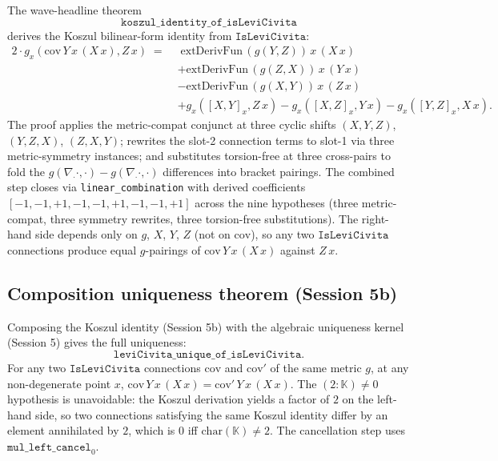\documentclass[twocolumn]{revtex4-2}
\begin{document}
The wave-headline theorem
\begin{equation*}
\texttt{koszul\_identity\_of\_isLeviCivita}
\end{equation*}
derives the Koszul bilinear-form identity from $\texttt{IsLeviCivita}$:
\begin{align*}
2 \cdot g_x(\mathrm{cov}\,Y\,x\,(X\,x), Z\,x)
\;=\;& \;\mathrm{extDerivFun}\,(g(Y, Z))\,x\,(X\,x) \\
& + \mathrm{extDerivFun}\,(g(Z, X))\,x\,(Y\,x) \\
& - \mathrm{extDerivFun}\,(g(X, Y))\,x\,(Z\,x) \\
& + g_x([X, Y]_x, Z\,x) - g_x([X, Z]_x, Y\,x) - g_x([Y, Z]_x, X\,x).
\end{align*}
The proof applies the metric-compat conjunct at three cyclic shifts
$(X,Y,Z)$, $(Y,Z,X)$, $(Z,X,Y)$; rewrites the slot-2 connection terms
to slot-1 via three metric-symmetry instances; and substitutes
torsion-free at three cross-pairs to fold the $g(\nabla_\cdot \cdot,
\cdot) - g(\nabla_\cdot \cdot, \cdot)$ differences into bracket
pairings. The combined step closes via
\texttt{linear\_combination} with derived coefficients $[-1, -1,
+1, -1, -1, +1, -1, -1, +1]$ across the nine hypotheses (three
metric-compat, three symmetry rewrites, three torsion-free
substitutions). The right-hand side depends only on $g$, $X$, $Y$, $Z$
(not on $\mathrm{cov}$), so any two $\texttt{IsLeviCivita}$
connections produce equal $g$-pairings of $\mathrm{cov}\,Y\,x\,(X\,x)$
against $Z\,x$.

\subsection{Composition uniqueness theorem (Session 5b)}

Composing the Koszul identity (Session 5b) with the algebraic
uniqueness kernel (Session 5) gives the full uniqueness:
\begin{equation*}
\texttt{leviCivita\_unique\_of\_isLeviCivita}.
\end{equation*}
For any two $\texttt{IsLeviCivita}$ connections $\mathrm{cov}$ and
$\mathrm{cov}'$ of the same metric $g$, at any non-degenerate point
$x$, $\mathrm{cov}\,Y\,x\,(X\,x) = \mathrm{cov}'\,Y\,x\,(X\,x)$. The
$(2 : \mathbb{K}) \neq 0$ hypothesis is unavoidable: the Koszul
derivation yields a factor of $2$ on the left-hand side, so two
connections satisfying the same Koszul identity differ by an element
annihilated by $2$, which is $0$ iff $\mathrm{char}(\mathbb{K}) \neq
2$. The cancellation step uses $\texttt{mul\_left\_cancel}_0$.
\end{document}
